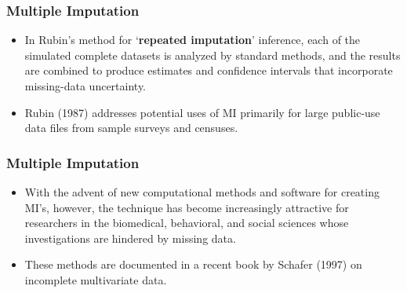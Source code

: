 \documentclass[MASTER.tex]{subfiles}
\begin{document}
	\begin{frame}
\frametitle{Multiple Imputation}
		\Large
		\begin{itemize}
\item In Rubin's method for `\textbf{repeated imputation}' inference, each of the simulated complete datasets is analyzed by standard methods, and the results are combined to produce estimates and confidence intervals that incorporate missing-data uncertainty.
\item  Rubin (1987) addresses potential uses of MI primarily for large public-use data files from sample surveys and censuses. 
		\end{itemize}

	\end{frame}
	\begin{frame}
		\frametitle{Multiple Imputation}
		\Large
	\begin{itemize}
\item With the advent of new computational methods and software for creating MI's, however, the technique has become increasingly attractive for researchers in the biomedical, behavioral, and social sciences whose investigations are hindered by missing data. 
\item These methods are documented in a recent book by Schafer (1997) on incomplete multivariate data.
	\end{itemize}

\end{frame}
\end{document}
